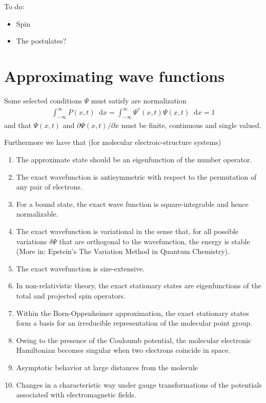 \documentclass[twoside,english]{uiofysmaster}
\newcommand*\dif{\mathop{}\!\mathrm{d}}
\begin{document}
To do:
\begin{itemize}
	\item Spin
	\item The postulates?
\end{itemize}

\section{Approximating wave functions}
Some selected conditions $\Psi$ must satisfy \cite{HjortJensen2015} are normalization 
\begin{align}
	\int_{-\infty}^{\infty} P(x,t) \dif x = \int_{-\infty}^{\infty} \Psi^{\ast}(x,t) \Psi (x,t) \dif x = 1
\end{align}
and that $\Psi (x,t)$ and $\partial \Psi(x,t) / \partial x$ must be finite, continuous and single valued.

Furthermore we have that \cite{Helgaker2000} (for molecular electroic-structure systems)
\begin{enumerate}
	\item The approximate state should be an eigenfunction of the number operator.
	\item The exact wavefunction is antisymmetric with respect to the permutation of any pair of electrons.
	\item For a bound state, the exact wave function is square-integrable and hence normalizable.
	\item The exact wavefunction is variational in the sense that, for all possible variations $\delta \Psi$ that are orthogonal to the wavefunction, the energy is stable (More in: Epstein's The Variation Method in Quantum Chemistry).
	\item The exact wavefunction is size-extensive. 
	\item In non-relativistic theory, the exact stationary states are eigenfunctions of the total and projected spin operators.
	\item Within the Born-Oppenheimer approximation, the exact stationary states form a basis for an irreducible representation of the molecular point group. 
	\item Owing to the presence of the Couloumb potential, the molecular electronic Hamiltonian becomes singular when two electrons coincide in space.
	\item Asymptotic behavior at large distances from the molecule
	\item Changes in a characteristic way under gauge transformations of the potentials associated with electromagnetic fields.
\end{enumerate}
\end{document}
